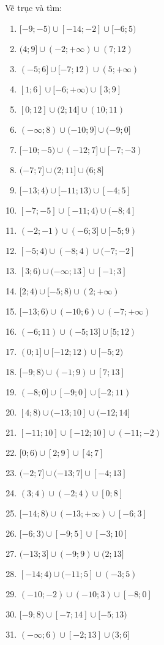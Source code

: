 \documentclass[12pt,a4paper]{article}
\begin{document}
\begin{ex}
	Vẽ trục và tìm:
	\begin{enumerate}
		\item $[-9;-5)\cup[-14;-2]\cup[-6;5)$
		\item $(4;9]\cup(-2;+ \infty)\cup(7;12)$
		\item $(-5;6]\cup[-7;12)\cup(5;+ \infty)$
		\item $[1;6]\cup[-6;+ \infty)\cup[3;9]$
		\item $[0;12]\cup(2;14]\cup(10;11)$
		\item $(-\infty;8)\cup(-10;9]\cup(-9;0]$
		\item $[-10;-5)\cup(-12;7]\cup[-7;-3)$
		\item $(-7;7]\cup(2;11]\cup(6;8]$
		\item $[-13;4)\cup[-11;13)\cup[-4;5]$
		\item $[-7;-5]\cup[-11;4)\cup(-8;4]$
		\item $(-2;-1)\cup(-6;3]\cup[-5;9)$
		\item $[-5;4)\cup(-8;4)\cup(-7;-2]$
		\item $[3;6)\cup(-\infty;13]\cup[-1;3]$
		\item $[2;4)\cup[-5;8)\cup(2;+ \infty)$
		\item $[-13;6)\cup(-10;6)\cup(-7;+ \infty)$
		\item $(-6;11)\cup(-5;13]\cup[5;12)$
		\item $(0;1]\cup[-12;12)\cup[-5;2)$
		\item $[-9;8)\cup(-1;9)\cup[7;13]$
		\item $(-8;0]\cup[-9;0]\cup[-2;11)$
		\item $[4;8)\cup(-13;10]\cup(-12;14]$
		\item $[-11;10]\cup[-12;10]\cup(-11;-2)$
		\item $[0;6)\cup[2;9]\cup[4;7]$
		\item $(-2;7]\cup(-13;7]\cup[-4;13]$
		\item $(3;4)\cup(-2;4)\cup[0;8]$
		\item $[-14;8)\cup(-13;+ \infty)\cup[-6;3]$
		\item $[-6;3)\cup[-9;5]\cup[-3;10]$
		\item $(-13;3]\cup(-9;9)\cup(2;13]$
		\item $[-14;4)\cup(-11;5]\cup(-3;5)$
		\item $(-10;-2)\cup(-10;3)\cup[-8;0]$
		\item $[-9;8)\cup[-7;14]\cup[-5;13)$
		\item $(-\infty;6)\cup[-2;13]\cup(3;6]$

\end{enumerate}
\end{ex}
\end{document}
